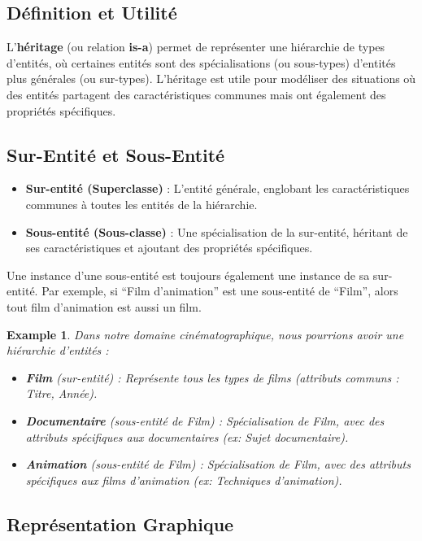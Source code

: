 \documentclass{article}
\newtheorem{example}{Example}
\begin{document}
\subsection{Définition et Utilité}

L'\textbf{héritage} (ou relation \textbf{is-a}) permet de représenter une hiérarchie de types d'entités, où certaines entités sont des spécialisations (ou sous-types) d'entités plus générales (ou sur-types).  L'héritage est utile pour modéliser des situations où des entités partagent des caractéristiques communes mais ont également des propriétés spécifiques.

\subsection{Sur-Entité et Sous-Entité}

\begin{itemize}
    \item \textbf{Sur-entité (Superclasse)} : L'entité générale, englobant les caractéristiques communes à toutes les entités de la hiérarchie.
    \item \textbf{Sous-entité (Sous-classe)} :  Une spécialisation de la sur-entité, héritant de ses caractéristiques et ajoutant des propriétés spécifiques.
\end{itemize}

Une instance d'une sous-entité est toujours également une instance de sa sur-entité.  Par exemple, si ``Film d'animation'' est une sous-entité de ``Film'', alors tout film d'animation est aussi un film.

\begin{example}
    Dans notre domaine cinématographique, nous pourrions avoir une hiérarchie d'entités :
    \begin{itemize}
        \item \textbf{Film} (sur-entité) : Représente tous les types de films (attributs communs : Titre, Année).
        \item \textbf{Documentaire} (sous-entité de Film) : Spécialisation de Film, avec des attributs spécifiques aux documentaires (ex: Sujet documentaire).
        \item \textbf{Animation} (sous-entité de Film) : Spécialisation de Film, avec des attributs spécifiques aux films d'animation (ex: Techniques d'animation).
    \end{itemize}
\end{example}

\subsection{Représentation Graphique}
\end{document}
